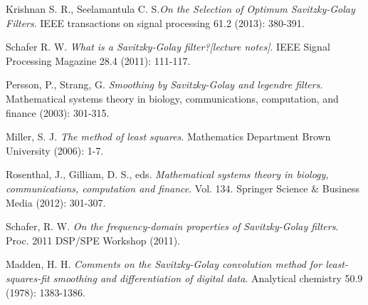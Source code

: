 \documentclass[a4paper]{article}
\begin{document}
\pagebreak
\begin{thebibliography}{10}
Krishnan S. R., Seelamantula C. S.\textit{On the Selection of Optimum Savitzky-Golay Filters}. IEEE transactions on signal processing 61.2 (2013): 380-391.

Schafer R. W. \textit{What is a Savitzky-Golay filter?[lecture notes]}. IEEE Signal Processing Magazine 28.4 (2011): 111-117.

Persson, P., Strang, G. \textit{Smoothing by Savitzky-Golay and legendre filters}. Mathematical systems theory in biology, communications, computation, and finance (2003): 301-315.

Miller, S. J. \textit{The method of least squares}. Mathematics Department Brown University (2006): 1-7.

Rosenthal, J.,  Gilliam, D. S., eds. \textit{Mathematical systems theory in biology, communications, computation and finance}. Vol. 134. Springer Science \& Business Media (2012): 301-307.

Schafer, R. W. \textit{On the frequency-domain properties of Savitzky-Golay filters}. Proc. 2011 DSP/SPE Workshop (2011).

Madden, H. H. \textit{Comments on the Savitzky-Golay convolution method for least-squares-fit smoothing and differentiation of digital data}. Analytical chemistry 50.9 (1978): 1383-1386.


\end{thebibliography}
\end{document}
